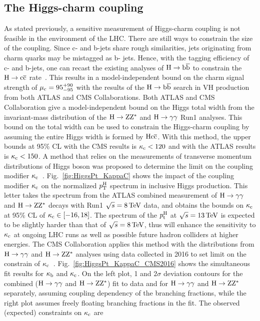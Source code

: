 \subsection*{The Higgs-charm coupling}
As stated previously, a sensitive measurement of Higgs-charm coupling is not feasible in the environment of the LHC. There are still ways to constrain the size of the coupling. Since c- and b-jets share rough similarities, jets originating from charm quarks may be mistagged as b- jets. Hence, with the tagging efficiency of c- and b-jets, one can recast the existing analyses of $\mathrm{H}\to\mathrm{b}\overline{\mathrm{b}}$ to constrain the $\mathrm{H}\to\mathrm{c}\overline{\mathrm{c}}$ rate~\cite{Perez:2015aoa}. This results in a model-independent bound on the charm signal strength of $\mu_{\mathrm{c}}=95^{+90}_{-95}$ with the results of the $\mathrm{H}\to\mathrm{b}\overline{\mathrm{b}}$ search in VH production from both ATLAS and CMS Collaborations. 
Both ATLAS and CMS Collaboration give a model-independent bound on the Higgs total width from the invariant-mass distribution of the $\mathrm{H}\to\mathrm{Z}\mathrm{Z}^{*}$ and $\mathrm{H}\to\gamma\gamma$ Run1 analyses. This bound on the total width can be used to constrain the Higgs-charm coupling by assuming the entire Higgs width is formed by $\mathrm{H}\mathrm{c}\overline{\mathrm{c}}$. With this method, the upper bounds at 95\% CL with the CMS results is $\kappa_{\mathrm{c}}<120$ and with the ATLAS results is $\kappa_{\mathrm{c}}<150$. 
A method that relies on the measurements of transverse momentum distributions of Higgs boson was proposed to determine the limit on the coupling modifier $\kappa_{\mathrm{c}}$~\cite{Bishara:2016jga}. Fig.~\ref{fig:HiggsPt_KappaC} shows the impact of the coupling modifier $\kappa_{\mathrm{c}}$ on the normalized $p_{\text{T}}^{\mathrm{H}}$ spectrum in inclusive Higgs production. This letter takes the \pt spectrum from the ATLAS combined measurement of $\mathrm{H}\to\gamma\gamma$ and $\mathrm{H}\to\mathrm{Z}\mathrm{Z}^{*}$ decays with Run1 $\sqrt{s}=8\,\text{Te\hspace{-.08em}V}$ data, and obtains the bounds on $\kappa_{\mathrm{c}}$ at 95\% CL of $\kappa_{\mathrm{c}}\in [-16,18]$. The spectrum of the $p_{\text{t}}^{\mathrm{H}}$ at $\sqrt{s}=13\,\text{Te\hspace{-.08em}V}$ is expected to be slightly harder than that of $\sqrt{s}=8\,\text{Te\hspace{-.08em}V}$, thus will enhance the sensitivity to $\kappa_{\mathrm{c}}$ at ongoing LHC runs as well as possible future hadron colliders at higher energies. The CMS Collaboration applies this method with the distributions from $\mathrm{H}\to\gamma\gamma$ and $\mathrm{H}\to\mathrm{Z}\mathrm{Z}^{*}$ analyses using data collected in 2016 to set limit on the constrain of $\kappa_{\mathrm{c}}$~\cite{CMS-PAS-HIG-17-028}. Fig.~\ref{fig:HiggsPt_KappaC_CMS2016} shows the simultaneous fit results for $\kappa_{\mathrm{b}}$ and $\kappa_{\mathrm{c}}$. On the left plot, 1 and $2\sigma$ deviation contours for the combined ($\mathrm{H}\to\gamma\gamma$ and $\mathrm{H}\to\mathrm{Z}\mathrm{Z}^{*}$) fit to data and for $\mathrm{H}\to\gamma\gamma$ and $\mathrm{H}\to\mathrm{Z}\mathrm{Z}^{*}$ separately, assuming coupling dependency of the branching fractions, while the right plot assumes freely floating branching fractions in the fit. The observed (expected) constraints on $\kappa_{\mathrm{c}}$ are

